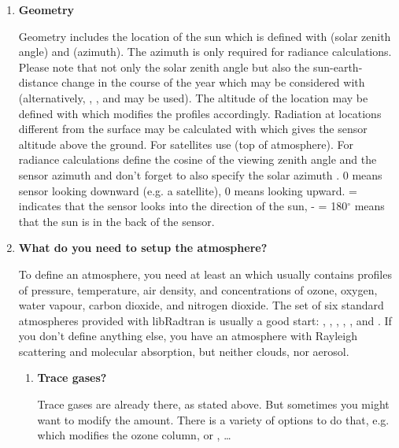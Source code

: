 \begin{enumerate}
\item{\bf Geometry}

  Geometry includes the location of the sun which is defined with 
  (solar zenith angle) and  (azimuth). The azimuth is only required
  for radiance calculations. Please note that not only the solar zenith
  angle but also the sun-earth-distance change in the course of the year
  which may be considered with  (alternatively,
  , , and  may be used). The altitude of the
  location may be defined with  which modifies the profiles
  accordingly. Radiation at locations different from the surface may be
  calculated with  which gives the sensor altitude above the
  ground. For satellites use  (top of atmosphere). For
  radiance calculations define the cosine of the viewing zenith angle
   and the sensor azimuth  and don't forget to also specify the
  solar azimuth . 0 means sensor looking downward (e.g. a
  satellite), 0 means looking upward.  =  indicates that the
  sensor looks into the direction of the sun, - = 180$^\circ$ means that
  the sun is in the back of the sensor.

\item{\bf What do you need to setup the atmosphere?}

  To define an atmosphere, you need at least an 
  which usually contains profiles of pressure, temperature, air density,
  and concentrations of ozone, oxygen, water vapour, carbon dioxide, and
  nitrogen dioxide. The set of six standard atmospheres provided with
  libRadtran is usually a good start: ,
  , ,
  , , and . If
  you don't define anything else, you have an atmosphere with Rayleigh
  scattering and molecular absorption, but neither clouds, nor aerosol.
  
  \begin{enumerate}
  \item {\bf Trace gases?}
    
    Trace gases are already there, as stated above. But sometimes you
    might want to modify the amount. There is a variety of options to do
    that, e.g.  which modifies the ozone column, or
    , \dots
    

\end{enumerate}
\end{enumerate}
